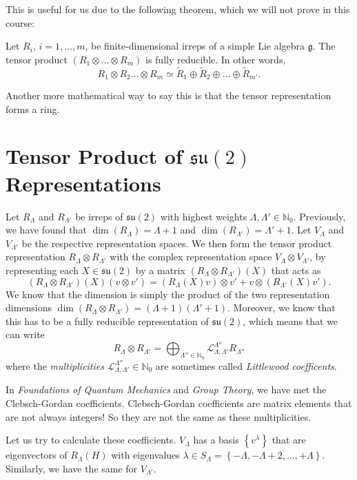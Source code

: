 This is useful for us due to the following theorem, which we will not prove in this course:
\begin{theorem}[]
  Let $R_i$, $i = 1, \dots, m$, be finite-dimensional irreps of a simple Lie algebra $\mathfrak{g}$. The tensor product $(R_1 \otimes \dots \otimes R_m)$ is fully reducible.
  In other words,
  \begin{equation}
    R_1 \otimes R_2 \dots \otimes R_m \simeq \widetilde{R}_1 \oplus \widetilde{R}_2 \oplus \dots \oplus \widetilde{ R}_{m'}.
  \end{equation}
\end{theorem}
\begin{leftbar}
  \begin{remark}
    Another more mathematical way to say this is that the tensor representation forms a ring.
  \end{remark}
\end{leftbar}

\section{Tensor Product of \texorpdfstring{$\mathfrak{su}(2)$}{the Lie Algebra of SU(2)} Representations}%
\label{sec:tensor_product_of_su2_reps}

Let $R_\Lambda$ and $R_{\Lambda'}$ be irreps of $\mathfrak{su}(2)$ with highest weights $\Lambda, \Lambda' \in \mathbb{N}_0$. Previously, we have found that $\dim(R_\Lambda) = \Lambda + 1$ and $\dim (R_{\Lambda'}) = \Lambda' + 1$.
Let $V_{\Lambda}$ and $V_{\Lambda'}$ be the respective representation spaces.
We then form the tensor product representation $R_{\Lambda} \otimes R_{\Lambda'}$ with the complex representation space $V_{\Lambda} \otimes V_{\Lambda'}$, by representing each $X \in \mathfrak{su}(2)$ by a matrix $(R_{\Lambda} \otimes R_{\Lambda'})(X)$ that acts as
\begin{equation}
  (R_{\Lambda} \otimes R_{\Lambda'})(X)(v \otimes v') = (R_{\Lambda}(X)v) \otimes v' + v \otimes (R_{\Lambda'}(X)v').
\end{equation}
We know that the dimension is simply the product of the two representation dimensions $\dim(R_{\Lambda} \otimes R_{\Lambda'}) = (\Lambda + 1)(\Lambda' + 1)$.
Moreover, we know that this has to be a fully reducible representation of $\mathfrak{su}(2)$, which means that we can write
\begin{equation}
  R_{\Lambda} \otimes R_{\Lambda'} = \bigoplus_{\Lambda'' \in \mathbb{N}_0} \mathcal{L}^{\Lambda''}_{\Lambda, \Lambda'} R_{\Lambda''}
\end{equation}
where the \emph{multiplicities} $\mathcal{L}^{\Lambda''}_{\Lambda, \Lambda'} \in \mathbb{N}_0$ are sometimes called \emph{Littlewood coefficents}.
\begin{leftbar}
  \begin{remark}
    In \emph{Foundations of Quantum Mechanics} and \emph{Group Theory}, we have met the Clebsch-Gordan coefficients.
    Clebsch-Gordan coefficients are matrix elements that are not always integers! So they are not the same as these multiplicities.
  \end{remark}
\end{leftbar}

Let us try to calculate these coefficients.
$V_\Lambda$ has a basis $\left\{ v^{\lambda} \right\}$ that are eigenvectors of $R_\Lambda(H)$ with eigenvalues $\lambda \in S_{\Lambda} = \left\{ -\Lambda, -\Lambda + 2, \dots, +\Lambda \right\}$. Similarly, we have the same for $V_{\Lambda'}$.
